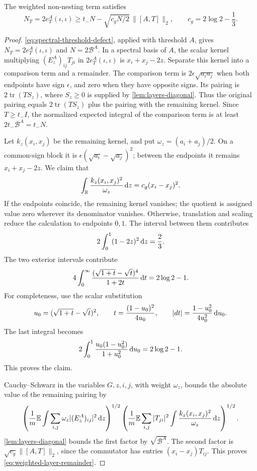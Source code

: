 \begin{lemma}\label{lem:layers-constant}
The weighted non-nesting term satisfies
\begin{equation}
 N_T=2e_T^A(\iota,\iota)
 \ge t_-N-\sqrt{c_gN/2}\,\|[A,T]\|_2,
 \qquad c_g=2\log2-\frac13.
 \label{eq:weighted-layer-remainder}
\end{equation}
\end{lemma}

\begin{proof}
\eqref{eq:spectral-threshold-defect}, applied with threshold $A$, gives $N_T=2e_T^A(\iota,\iota)$ and $N=2\mathcal{B}^A$. In a spectral basis of $A$, the scalar kernel multiplying $(E_z^A)_{ij}T_{ji}$ in $2e_T^A(\iota,\iota)$ is $x_i+x_j-2z$. Separate this kernel into a comparison term and a remainder. The comparison term is $2\epsilon\sqrt{a_i a_j}$ when both endpoints have sign $\epsilon$, and zero when they have opposite signs. Its pairing is $2\operatorname{tr}(TS_z)$, where $S_z\ge0$ is supplied by \cref{lem:layers-diagonal}. Thus the original pairing equals $2\operatorname{tr}(TS_z)$ plus the pairing with the remaining kernel. Since $T\ge t_-I$, the normalized expected integral of the comparison term is at least $2t_-\mathcal{B}^A=t_-N$.

Let $k_z(x_i,x_j)$ be the remaining kernel, and put $\omega_z=(a_i+a_j)/2$. On a common-sign block it is $\epsilon(\sqrt{a_i}-\sqrt{a_j})^2$; between the endpoints it remains $x_i+x_j-2z$. We claim that
\[
 \int_{\mathbb{R}}\frac{k_z(x_i,x_j)^2}{\omega_z}\,\mathrm{d} z
 =c_g(x_i-x_j)^2.
\]
If the endpoints coincide, the remaining kernel vanishes; the quotient is assigned value zero wherever its denominator vanishes.  Otherwise, translation and scaling reduce the calculation to endpoints $0,1$. The interval between them contributes
\[
 2\int_0^1(1-2z)^2\,\mathrm{d} z=\frac23.
\]
The two exterior intervals contribute
\[
 4\int_0^\infty
       \frac{(\sqrt{1+t}-\sqrt t)^4}{1+2t}\,\mathrm{d} t=2\log2-1.
\]
For completeness, use the scalar substitution
\[
 u_0=(\sqrt{1+t}-\sqrt t)^2,\qquad
 t=\frac{(1-u_0)^2}{4u_0},\qquad
 |dt|=\frac{1-u_0^2}{4u_0^2}\,\mathrm{d} u_0.
\]
The last integral becomes
\[
 2\int_0^1\frac{u_0(1-u_0^2)}{1+u_0^2}\,\mathrm{d} u_0
 =2\log2-1.
\]
This proves the claim.

Cauchy--Schwarz in the variables $G,z,i,j$, with weight $\omega_z$, bounds the absolute value of the remaining pairing by
\[
 \left(\frac1m\mathbb{E}\int
          \sum_{i,j}\omega_z|(E_z^A)_{ij}|^2\,\mathrm{d} z\right)^{1/2}
 \left(\frac1m\mathbb{E}\sum_{i,j}|T_{ji}|^2
          \int\frac{k_z(x_i,x_j)^2}{\omega_z}\,\mathrm{d} z\right)^{1/2}.
\]
\cref{lem:layers-diagonal} bounds the first factor by $\sqrt{\mathcal{B}^A}$. The second factor is $\sqrt{c_g}\|[A,T]\|_2$, since the commutator has entries $(x_i-x_j)T_{ij}$. This proves \eqref{eq:weighted-layer-remainder}.
\end{proof}

